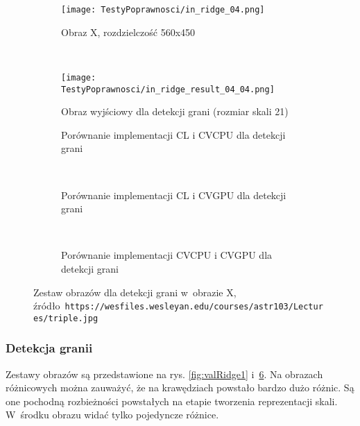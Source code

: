 \begin{figure}[H]

\begin{center}
\begin{subfigure}[t]{0.3\textwidth}
\texttt{[image: TestyPoprawnosci/in\_ridge\_04.png]}
\caption{Obraz X, rozdzielczość 560x450}
\label{fig:valRidge04}
\end{subfigure}
~
\begin{subfigure}[t]{0.3\textwidth}
\texttt{[image: TestyPoprawnosci/in\_ridge\_result\_04\_04.png]}
\caption{Obraz wyjściowy dla detekcji grani (rozmiar skali 21)}
\label{fig:valRidgeResult04}
\end{subfigure}
\end{center}

\begin{subfigure}[t]{0.3\textwidth}
	\centering
	\setlength\fboxsep{0pt}
	\setlength\fboxrule{0.5pt}
	\caption{Porównanie implementacji CL i CVCPU dla detekcji grani}
	\label{fig:valRidge4CLCVCPU}
\end{subfigure}
~
\begin{subfigure}[t]{0.3\textwidth}
	\centering
	\setlength\fboxsep{0pt}
	\setlength\fboxrule{0.5pt}
	\caption{Porównanie implementacji CL i CVGPU dla detekcji grani}
	\label{fig:valRidge4CLCVGPU}
\end{subfigure}
~
\begin{subfigure}[t]{0.3\textwidth}
	\centering
	\setlength\fboxsep{0pt}
	\setlength\fboxrule{0.5pt}
	\caption{Porównanie implementacji CVCPU i CVGPU dla detekcji grani}
	\label{fig:valRidge4CVCPUCVGPU}                 
\end{subfigure}
\caption{Zestaw obrazów dla detekcji grani w~obrazie X, \tiny{źródło~\texttt{https://wesfiles.wesleyan.edu/courses/astr103/Lectures/triple.jpg}}}

\label{fig:valRidge4}
\end{figure}

\subsubsection{Detekcja granii}
\label{subsubsec:granieRysunki}

Zestawy obrazów są przedstawione na rys. \ref{fig:valRidge1} i~\ref{fig:valRidge4}. Na obrazach różnicowych można zauważyć, że na krawędziach powstało bardzo dużo różnic. Są one pochodną rozbieżności powstałych na etapie tworzenia reprezentacji skali. W~środku obrazu widać tylko pojedyncze różnice. 
